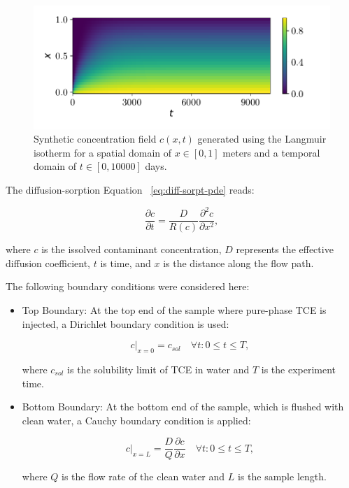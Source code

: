 \begin{figure}[h]
    \centering
    \includegraphics{figs/c_diss_field_full.pdf}
    \caption{Synthetic concentration field $c(x,t)$ generated using the Langmuir isotherm for a spatial domain of $x \in [0, 1]$ meters and a temporal domain of $t \in [0, 10000]$ days.}
    \label{fig:c_diss_field_full}
\end{figure}


The diffusion-sorption Equation ~\vref{eq:diff-sorpt-pde} reads:

\begin{equation}
    \frac{\partial c}{\partial t} = \frac{D}{R(c)} \frac{\partial^2 c}{\partial x^2},
    \label{eq:diff-sorpt-pde}
\end{equation}

where $c$ is the issolved contaminant concentration, $D$ represents the effective diffusion coefficient, $t$ is time, and $x$ is the distance along the flow path.

The following boundary conditions were considered here:

\begin{itemize}
    \item Top Boundary: At the top end of the sample where pure-phase TCE is injected, a Dirichlet boundary condition is used:

    \begin{equation}
        c|_{x=0} = c_{sol} \quad \forall t : 0 \leq t \leq T,
    \end{equation}

    where $c_{sol}$ is the solubility limit of TCE in water and $T$ is the experiment time.

    \item Bottom Boundary: At the bottom end of the sample, which is flushed with clean water, a Cauchy boundary condition is applied:

    \begin{equation}
        c|_{x=L} = \frac{D}{Q} \frac{\partial c}{\partial x} \quad \forall t : 0 \leq t \leq T,
    \end{equation}

    where $Q$ is the flow rate of the clean water and $L$ is the sample length.
\end{itemize}

